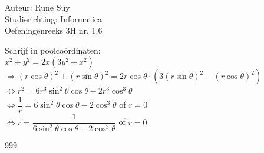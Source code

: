 \documentclass[a4paper]{article}
\begin{document}
  
\noindent \large Auteur: Rune Suy \\
\noindent \large Studierichting: Informatica\\
\noindent \large Oefeningenreeks 3H nr. 1.6\\

\medskip

\normalsize

Schrijf in poolcoördinaten: \\

$x^2 + y^2 = 2x(3y^2 - x^2)$\\

$\Rightarrow (r\cos\theta)^2 + (r\sin\theta)^2 = 2r\cos\theta \cdot (3(r\sin\theta)^2 - (r\cos\theta)^2)$\\

$\Leftrightarrow r^2 = 6r^3\sin^2\theta\cos\theta - 2r^3\cos^3\theta$\\

$\Leftrightarrow \dfrac{1}{r} = 6\sin^2\theta \cos\theta - 2\cos^3\theta$ of $r=0$\\

$\Leftrightarrow r = \dfrac{1}{6\sin^2\theta \cos\theta - 2\cos^3\theta}$ of $r=0$\\

\begin{thebibliography}{999}
\end{thebibliography}
\end{document}
